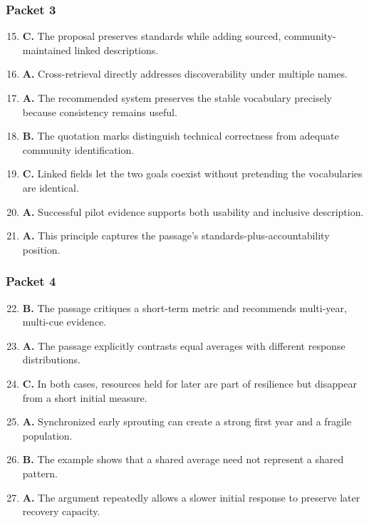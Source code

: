 \subsubsection*{Packet 3}
\begin{enumerate}
\setcounter{enumi}{14}
\item \textbf{C.} The proposal preserves standards while adding sourced, community-maintained linked descriptions.
\item \textbf{A.} Cross-retrieval directly addresses discoverability under multiple names.
\item \textbf{A.} The recommended system preserves the stable vocabulary precisely because consistency remains useful.
\item \textbf{B.} The quotation marks distinguish technical correctness from adequate community identification.
\item \textbf{C.} Linked fields let the two goals coexist without pretending the vocabularies are identical.
\item \textbf{A.} Successful pilot evidence supports both usability and inclusive description.
\item \textbf{A.} This principle captures the passage's standards-plus-accountability position.
\end{enumerate}

\subsubsection*{Packet 4}
\begin{enumerate}
\setcounter{enumi}{21}
\item \textbf{B.} The passage critiques a short-term metric and recommends multi-year, multi-cue evidence.
\item \textbf{A.} The passage explicitly contrasts equal averages with different response distributions.
\item \textbf{C.} In both cases, resources held for later are part of resilience but disappear from a short initial measure.
\item \textbf{A.} Synchronized early sprouting can create a strong first year and a fragile population.
\item \textbf{B.} The example shows that a shared average need not represent a shared pattern.
\item \textbf{A.} The argument repeatedly allows a slower initial response to preserve later recovery capacity.
\end{enumerate}
